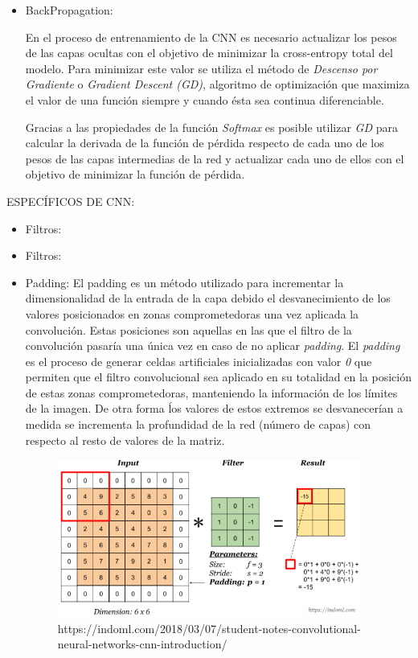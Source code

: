 \begin{itemize}
                \item BackPropagation:

                    En el proceso de entrenamiento de la CNN es necesario actualizar los pesos de las capas ocultas con el objetivo de minimizar la cross-entropy total del modelo. Para minimizar este valor se utiliza el método de \textit{Descenso por Gradiente} o \textit{Gradient Descent (GD)}, algoritmo de optimización que maximiza el valor de una función siempre y cuando ésta sea continua diferenciable.

                    Gracias a las propiedades de la función \textit{Softmax} es posible utilizar \textit{GD} para calcular la derivada de la función de pérdida respecto de cada uno de los pesos de las capas intermedias de la red y actualizar cada uno de ellos con el objetivo de minimizar la función de pérdida.

            \end{itemize}


            ESPECÍFICOS DE CNN:

            \begin{itemize}
                \item Filtros:
                \item Filtros:

                \item Padding: El padding es un método utilizado para incrementar la dimensionalidad de la entrada de la capa debido el desvanecimiento de los valores posicionados en zonas comprometedoras una vez aplicada la convolución. Estas posiciones son aquellas en las que el filtro de la convolución pasaría una única vez en caso de no aplicar \textit{padding}.
                El \textit{padding} es el proceso de generar celdas artificiales inicializadas con valor \textit{0} que permiten que el filtro convolucional sea aplicado en su totalidad en la posición de estas zonas comprometedoras, manteniendo la información de los límites de la imagen. De otra forma ĺos valores de estos extremos se desvanecerían a medida se incrementa la profundidad de la red (número de capas) con respecto al resto de valores de la matriz.

                \begin{figure}[h]
                    \centering
                    \includegraphics[width=10cm]{archivos/CNN/padding}
                    \caption{https://indoml.com/2018/03/07/student-notes-convolutional-neural-networks-cnn-introduction/}
                    \label{PaddingImage}
                 \end{figure}
                        
            \end{itemize}

